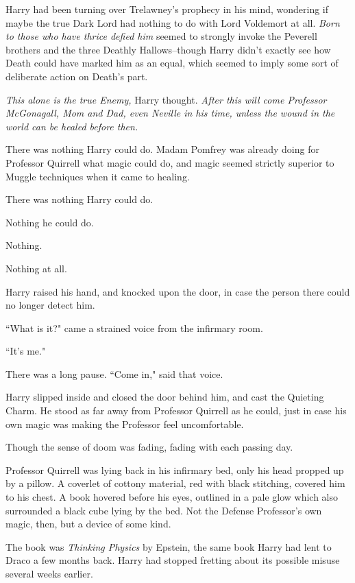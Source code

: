 Harry had been turning over Trelawney's prophecy in his mind, wondering if maybe the true Dark Lord had nothing to do with Lord Voldemort at all. \emph{Born to those who have thrice defied him} seemed to strongly invoke the Peverell brothers and the three Deathly Hallows\---though Harry didn't exactly see how Death could have marked him as an equal, which seemed to imply some sort of deliberate action on Death's part.

\emph{This alone is the true Enemy,} Harry thought. \emph{After this will come Professor McGonagall, Mom and Dad, even Neville in his time, unless the wound in the world can be healed before then.}

There was nothing Harry could do. Madam Pomfrey was already doing for Professor Quirrell what magic could do, and magic seemed strictly superior to Muggle techniques when it came to healing.

There was nothing Harry could do.

Nothing he could do.

Nothing.

Nothing at all.

\later

Harry raised his hand, and knocked upon the door, in case the person there could no longer detect him.

``What is it?" came a strained voice from the infirmary room.

``It's me."

There was a long pause. ``Come in," said that voice.

Harry slipped inside and closed the door behind him, and cast the Quieting Charm. He stood as far away from Professor Quirrell as he could, just in case his own magic was making the Professor feel uncomfortable.

Though the sense of doom was fading, fading with each passing day.

Professor Quirrell was lying back in his infirmary bed, only his head propped up by a pillow. A coverlet of cottony material, red with black stitching, covered him to his chest. A book hovered before his eyes, outlined in a pale glow which also surrounded a black cube lying by the bed. Not the Defense Professor's own magic, then, but a device of some kind.

The book was \emph{Thinking Physics} by Epstein, the same book Harry had lent to Draco a few months back. Harry had stopped fretting about its possible misuse several weeks earlier.

